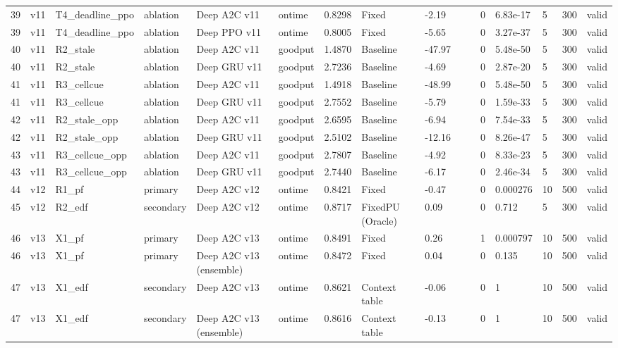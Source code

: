 \documentclass[10pt]{article}
\begin{document}
\begin{landscape}
\begin{longtable}{@{}llllllllllllllll@{}}
39 & v11 & T4\_deadline\_ppo & ablation & Deep A2C v11 & ontime & 0.8298 & Fixed & -2.19 &  &  & 0 & 6.83e-17 & 5 & 300 & valid \\
39 & v11 & T4\_deadline\_ppo & ablation & Deep PPO v11 & ontime & 0.8005 & Fixed & -5.65 &  &  & 0 & 3.27e-37 & 5 & 300 & valid \\
40 & v11 & R2\_stale & ablation & Deep A2C v11 & goodput & 1.4870 & Baseline & -47.97 &  &  & 0 & 5.48e-50 & 5 & 300 & valid \\
40 & v11 & R2\_stale & ablation & Deep GRU v11 & goodput & 2.7236 & Baseline & -4.69 &  &  & 0 & 2.87e-20 & 5 & 300 & valid \\
41 & v11 & R3\_cellcue & ablation & Deep A2C v11 & goodput & 1.4918 & Baseline & -48.99 &  &  & 0 & 5.48e-50 & 5 & 300 & valid \\
41 & v11 & R3\_cellcue & ablation & Deep GRU v11 & goodput & 2.7552 & Baseline & -5.79 &  &  & 0 & 1.59e-33 & 5 & 300 & valid \\
42 & v11 & R2\_stale\_opp & ablation & Deep A2C v11 & goodput & 2.6595 & Baseline & -6.94 &  &  & 0 & 7.54e-33 & 5 & 300 & valid \\
42 & v11 & R2\_stale\_opp & ablation & Deep GRU v11 & goodput & 2.5102 & Baseline & -12.16 &  &  & 0 & 8.26e-47 & 5 & 300 & valid \\
43 & v11 & R3\_cellcue\_opp & ablation & Deep A2C v11 & goodput & 2.7807 & Baseline & -4.92 &  &  & 0 & 8.33e-23 & 5 & 300 & valid \\
43 & v11 & R3\_cellcue\_opp & ablation & Deep GRU v11 & goodput & 2.7440 & Baseline & -6.17 &  &  & 0 & 2.46e-34 & 5 & 300 & valid \\
44 & v12 & R1\_pf & primary & Deep A2C v12 & ontime & 0.8421 & Fixed & -0.47 &  &  & 0 & 0.000276 & 10 & 500 & valid \\
45 & v12 & R2\_edf & secondary & Deep A2C v12 & ontime & 0.8717 & FixedPU (Oracle) & 0.09 &  &  & 0 & 0.712 & 5 & 300 & valid \\
46 & v13 & X1\_pf & primary & Deep A2C v13 & ontime & 0.8491 & Fixed & 0.26 &  &  & 1 & 0.000797 & 10 & 500 & valid \\
46 & v13 & X1\_pf & primary & Deep A2C v13 (ensemble) & ontime & 0.8472 & Fixed & 0.04 &  &  & 0 & 0.135 & 10 & 500 & valid \\
47 & v13 & X1\_edf & secondary & Deep A2C v13 & ontime & 0.8621 & Context table & -0.06 &  &  & 0 & 1 & 10 & 500 & valid \\
47 & v13 & X1\_edf & secondary & Deep A2C v13 (ensemble) & ontime & 0.8616 & Context table & -0.13 &  &  & 0 & 1 & 10 & 500 & valid \\

\end{longtable}
\end{landscape}
\end{document}
